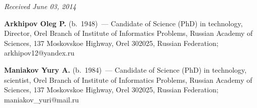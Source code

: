 \vspace*{-6pt}

\hfill{\small\textit{Received June 03, 2014}}

\vspace*{-18pt}

\Contr

  \noindent
  \textbf{Arkhipov Oleg P.} (b.\ 1948)~--- Candidate of Science (PhD) in
technology, Director, Orel Branch of Institute of Informatics Problems, Russian
Academy of Sciences, 137 Moskovskoe Highway, Orel 302025, Russian
Federation; arkhipov12@yandex.ru

  \vspace*{3pt}

  \noindent
  \textbf{Maniakov Yury A.} (b.\ 1984)~---
  Candidate of Science (PhD) in technology, scientist, Orel Branch of Institute of
Informatics Problems, Russian Academy of Sciences, 137 Moskovskoe Highway,
Orel 302025, Russian Federation; maniakov\_yuri@mail.ru

\label{end\stat}

\renewcommand{\bibname}{\protect\rm Литература}


